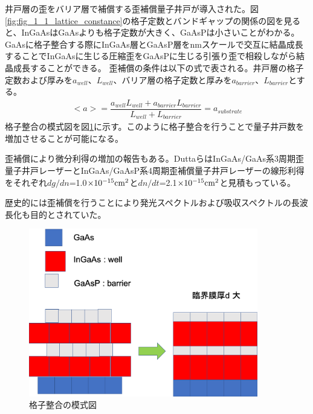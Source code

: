 井戸層の歪をバリア層で補償する歪補償量子井戸が導入された。図\ref{fig:fig_1_1_lattice_constance}の格子定数とバンドギャップの関係の図を見ると、InGaAsはGaAsよりも格子定数が大きく、GaAsPは小さいことがわかる。GaAsに格子整合する際に\rm{InGaAs}層とGaAsP層をnmスケールで交互に結晶成長することで\rm{InGaAs}に生じる圧縮歪をGaAsPに生じる引張り歪で相殺しながら結晶成長することができる。
歪補償の条件は以下の式で表される。井戸層の格子定数および厚みを$a_{well}$、$L_{well}$、バリア層の格子定数と厚みを$a_{barrier}$、$L_{barrier}$とする。
\begin{eqnarray}
<a>=\dfrac{a_{well}L_{well}+a_{barrier}L_{barrier}}{L_{well}+L_{barrier}}=a_{substrate}
\label{eq:conpensate}
\end{eqnarray}
格子整合の模式図を図\ref{fig:fig_1_1_lattice_strain_comp}に示す。このように格子整合を行うことで量子井戸数を増加させることが可能になる。


歪補償により微分利得の増加の報告もある\cite{ref_Dutta}。DuttaらはInGaAs/GaAs系3周期歪量子井戸レーザーとInGaAs/GaAsP系4周期歪補償量子井戸レーザーの線形利得をそれぞれ$dg/dn$=1.0$\times 10^{-15}\rm{cm^{2}}$と$dn/dt$=2.1$\times 10^{-15}\rm{cm^{2}}$と見積もっている。

歴史的には歪補償を行うことにより発光スペクトルおよび吸収スペクトルの長波長化も目的とされていた。



\begin{figure}[h]
	\centering
	\includegraphics[width=10cm]{figure/fig_1_1_lattice_strain.png}
	\caption{格子整合の模式図}
	\label{fig:fig_1_1_lattice_strain_comp}
\end{figure}

